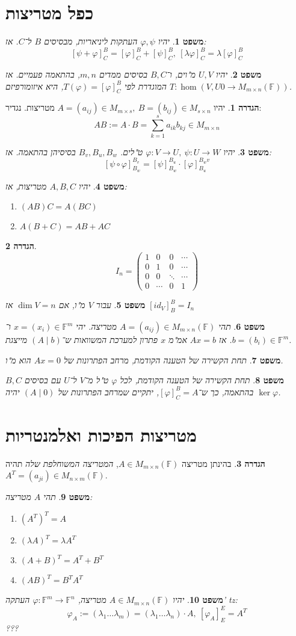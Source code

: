 \documentclass[]{article}
\newcommand\F         {\mathbb{F}}
\newcommand\co        {\colon}
\newcommand\pms[1]    {\begin{pmatrix}
		#1
\end{pmatrix}}
\renewcommand\lg      {\lambda}
\renewcommand\phi     {\varphi}
\newtheorem{Theorem}{משפט}
\theoremstyle{definition}
\newtheorem{definition}{הגדרה}
\newcommand\theo  [1] {\begin{Theorem}#1\end{Theorem}}
\newcommand\defi  [1] {\begin{definition}#1\end{definition}}
\begin{document}
\begin{multicols}{2}
		\section{כפל מטריצות}
		\theo{יהיו $\phi, \psi$ העתקות ליניאריות, מבסיסים $B$ ל־$C$. אז: 
			\[ [\psi + \phi]_C^B = [\phi]_C^B + [\psi]_C^B, \ [\lg\phi]_C^B = \lg[\phi]_C^B \]}
		\theo{יהיו $U, V$ מ"וים, ו־$B, C$ בסיסים ממדים $m, n$, בהתאמה פעמיים. אז $T \co \hom(V, U0 \to M_{m \times n}(\F))$ המוגדרת לפי $T(\phi) = [\phi]_C^B$, היא איזומורפיזם. }
		\defi{יהיו $A = (a_{ij}) \in M_{m \times s}, \ B = (b_{ij}) \in M_{s \times n}$ מטריצות. נגדיר: 
		\[ AB := A \cdot B = \sum_{k = 1}^{s}a_{ik}b_{kj} \in M_{m \times n} \]}
		\theo{יהיו $\phi \co V \to U, \ \psi \co U \to W$ ט"לים. $B_v, B_u, B_w$ בסיסיהן בהתאמה. אז: 
		\[ [\psi \circ \phi]_{B_w}^{B_v} = [\psi]_{B_w}^{B_u} \cdot [\phi]_{B_u}^{B_wv} \]}
		\theo{יהיו $A, B, C$ מטריצות, אז: 
		\begin{enumerate}
			\item \hfil $(AB)C = A(BC)$
			\item \hfil $A(B + C) = AB + AC$
		\end{enumerate}}
		\defi{
		\[ I_n = \pms{1 & 0 & 0 & \cdots \\ 0 & 1 & 0 & \cdots \\ 0 & 0 & \ddots & \cdots \\ 0 & \cdots & 0 & 1} \]}
		\theo{עבור $V$ מ"ו, אם $\dim V = n$ אז $[id_V]^B_B = I_n$}
		\theo{תהי $A = (a_{ij}) \in M_{m \times n}(\F)$ מטריצה. יהי $x = (x_i) \in \F^m$ ו־$b = (b_i) \in \F^m$. אז $Ax = b$ אמ"מ $x$ פתרון למערכת המשוואות ש־$(A \mid b)$ מייצגת. }
		\theo{תחת הקשירה של הטענה הקודמת, מרחב הפתרונות של $Ax = 0$ הוא מ"ו. }
		\theo{תחת הקשירה של הטענה הקודמת, לכל $\phi$ ט"ל מ־$V$ ל־$U$ עם בסיסים $B, C$ בהתאמה, כך ש־$[\phi]_C^B = A$, יתקיים שמרחב הפתרונות של $(A \mid 0)$ יהיה $\ker \phi$. }
		
		\section{מטריצות הפיכות ואלמנטריות}
		\defi{בהינתן מטריצה $A \in M_{m \times n}(\F)$, \textit{המטריצה המשוחלפת שלה} תהיה 
		$A^T = (a_{ji}) \in M_{n \times m}(\F)$. }
		\theo{תהי $A$ מטריצה: 
		\begin{enumerate}
			\item \hfil $(A^T)^T = A$
			\item \hfil $(\lg A)^T = \lg A^T$
			\item \hfil $(A + B)^T = A^T + B^T$
			\item \hfil $(AB)^T = B^TA^T$
		\end{enumerate}}
		\theo{יהיו $A \in M_{m \times n}(\F)$ מטריצה, $\phi \co \F^m \to \F^n$ העתקה' tz: 
		\[ \phi_A := (\lg_1 \dots \lg_m) = (\lg_1 \dots \lg_n) \cdot A, \ [\phi_A]^E_E = A^T \] ???}
		

\end{multicols}
\end{document}
